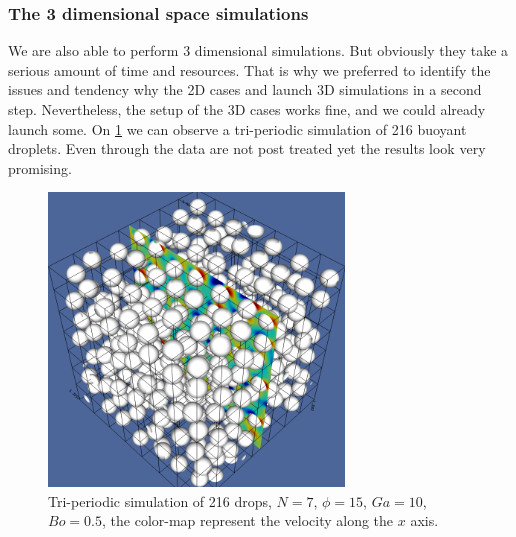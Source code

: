 \subsubsection*{The 3 dimensional space simulations} 
We are also able to perform 3 dimensional simulations. 
But obviously they take a serious amount of time and resources. 
That is why we preferred to identify the issues and tendency why the 2D cases and launch 3D simulations in a second step. 
Nevertheless, the setup of the 3D cases works fine, and we could already launch some. 
On \ref{fig:3D} we can observe a tri-periodic simulation of 216 buoyant droplets.
Even through the data are not post treated yet the results look very promising. 
\begin{figure}[h!]
    \centering
    \includegraphics[width =  0.7\textwidth]{image/3D/sim49.png}
    \caption{Tri-periodic simulation of 216 drops, $N=7$, $\phi=15$, $Ga = 10$, $Bo =0.5$, the color-map represent the velocity along the $x$ axis. }
    \label{fig:3D}
\end{figure}






